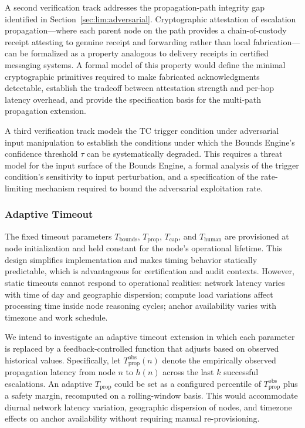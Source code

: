 A second verification track addresses the propagation-path integrity gap identified in Section~\ref{sec:lim:adversarial}. Cryptographic attestation of escalation propagation---where each parent node on the path provides a chain-of-custody receipt attesting to genuine receipt and forwarding rather than local fabrication---can be formalized as a property analogous to delivery receipts in certified messaging systems. A formal model of this property would define the minimal cryptographic primitives required to make fabricated acknowledgments detectable, establish the tradeoff between attestation strength and per-hop latency overhead, and provide the specification basis for the multi-path propagation extension.

A third verification track models the TC trigger condition under adversarial input manipulation to establish the conditions under which the Bounds Engine's confidence threshold $\tau$ can be systematically degraded. This requires a threat model for the input surface of the Bounds Engine, a formal analysis of the trigger condition's sensitivity to input perturbation, and a specification of the rate-limiting mechanism required to bound the adversarial exploitation rate.

\subsubsection{Adaptive Timeout}
\label{sec:fw:adaptive-timeout}

The fixed timeout parameters $T_{\text{bounds}}$, $T_{\text{prop}}$, $T_{\text{cap}}$, and $T_{\text{human}}$ are provisioned at node initialization and held constant for the node's operational lifetime. This design simplifies implementation and makes timing behavior statically predictable, which is advantageous for certification and audit contexts. However, static timeouts cannot respond to operational realities: network latency varies with time of day and geographic dispersion; compute load variations affect processing time inside node reasoning cycles; anchor availability varies with timezone and work schedule.

We intend to investigate an adaptive timeout extension in which each parameter is replaced by a feedback-controlled function that adjusts based on observed historical values. Specifically, let $T_{\text{prop}}^{\text{obs}}(n)$ denote the empirically observed propagation latency from node $n$ to $h(n)$ across the last $k$ successful escalations. An adaptive $T_{\text{prop}}$ could be set as a configured percentile of $T_{\text{prop}}^{\text{obs}}$ plus a safety margin, recomputed on a rolling-window basis. This would accommodate diurnal network latency variation, geographic dispersion of nodes, and timezone effects on anchor availability without requiring manual re-provisioning.

